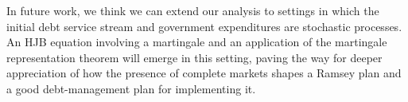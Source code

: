 \documentclass[12pt]{article}
\newcommand{\NW}[1]{{\textcolor{blue}{#1}}}
\newcommand{\TS}[1]{{\textcolor{magenta}{#1}}}
\begin{document}
{{In future work, we think we can extend our analysis to settings in which the initial debt service stream and  government expenditures  are stochastic processes.  An HJB equation involving  a martingale and an application of the martingale representation theorem %
will emerge in this setting, paving the way for deeper appreciation of how the presence of complete markets shapes a Ramsey plan and a good debt-management plan for implementing it. } 
%
%
%
%
}
\end{document}

